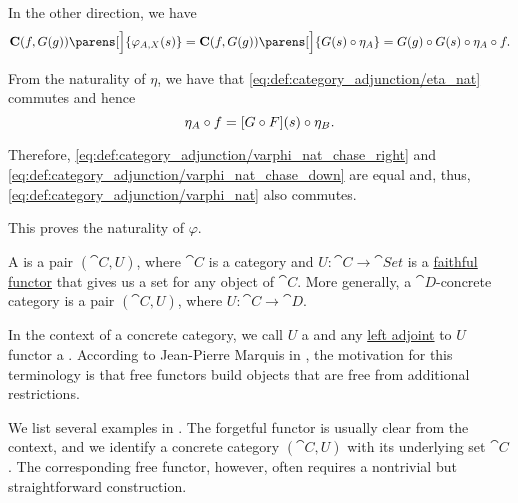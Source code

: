 \begin{defproof}
  In the other direction, we have
  \begin{equation}\label{eq:def:category_adjunction/varphi_nat_chase_down}
    \cat{C}(f, G(g))\parens[\Big]{ \varphi_{A, X}(s) }
    =
    \cat{C}(f, G(g))\parens[\Big]{ G(s) \bincirc \eta_A }
    =
    G(g) \bincirc G(s) \bincirc \eta_A \bincirc f.
  \end{equation}

  From the naturality of \( \eta \), we have that \eqref{eq:def:category_adjunction/eta_nat} commutes and hence
  \begin{equation*}
    \eta_A \bincirc f
    =
    [G \bincirc F](s) \bincirc \eta_B.
  \end{equation*}

  Therefore, \eqref{eq:def:category_adjunction/varphi_nat_chase_right} and \eqref{eq:def:category_adjunction/varphi_nat_chase_down} are equal and, thus, \eqref{eq:def:category_adjunction/varphi_nat} also commutes.

  This proves the naturality of \( \varphi \).
\end{defproof}

\begin{definition}\label{def:concrete_category}
  A  is a pair \( (\cat{C}, U) \), where \( \cat{C} \) is a category and \( U: \cat{C} \to \cat{Set} \) is a \hyperref[def:functor_invertibility/faithful]{faithful functor} that gives us a set for any object of \( \cat{C} \). More generally, a \( \cat{D} \)-concrete category is a pair \( (\cat{C}, U) \), where \( U: \cat{C} \to \cat{D} \).

  In the context of a concrete category, we call \( U \) a  and any \hyperref[def:category_adjunction]{left adjoint} to \( U \) functor a . According to Jean-Pierre Marquis in \cite{StanfordPlato:category_theory}, the motivation for this terminology is that free functors build objects that are free from additional restrictions.

  We list several examples in . The forgetful functor is usually clear from the context, and we identify a concrete category \( (\cat{C}, U) \) with its underlying set \( \cat{C} \). The corresponding free functor, however, often requires a nontrivial but straightforward construction.
\end{definition}

